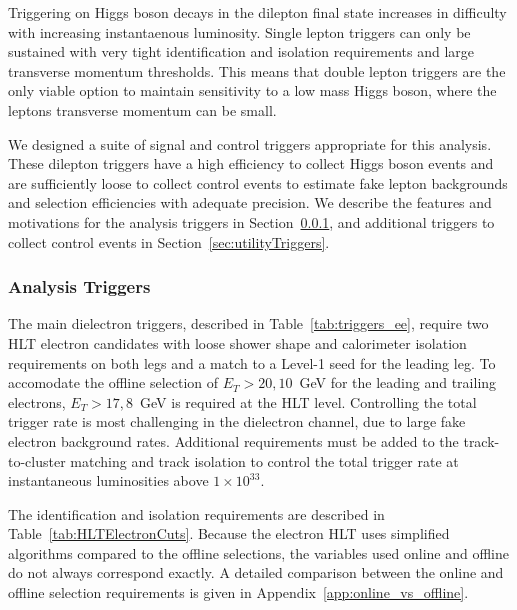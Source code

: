 Triggering on Higgs boson decays in the dilepton final state increases 
in difficulty with increasing instantaenous luminosity.
Single lepton triggers can only be sustained with very tight identification and
isolation requirements and large transverse momentum thresholds.
This means that double lepton triggers are the only viable option to maintain
sensitivity to a low mass Higgs boson, where the leptons transverse momentum
can be small.

We designed a suite of signal and control triggers appropriate for this analysis.
These dilepton triggers have a high efficiency to collect Higgs boson events
and are sufficiently loose to collect control events to estimate
fake lepton backgrounds and selection efficiencies with adequate precision.
We describe the features and motivations for the analysis triggers in Section~\ref{sec:mainTriggers},
and additional triggers to collect control events in Section~\ref{sec:utilityTriggers}.

\subsubsection{Analysis Triggers}
\label{sec:mainTriggers}

The main dielectron triggers, described in Table~\ref{tab:triggers_ee}, require two HLT electron
candidates with loose shower shape and calorimeter isolation requirements on both legs
and a match to a Level-1 seed for the leading leg.
To accomodate the offline selection of $E_{T}>20,10$~GeV for the leading and trailing
electrons, $E_{T}>17,8$~GeV is required at the HLT level.
Controlling the total trigger rate is most challenging in
the dielectron channel, due to large fake electron background rates.
Additional requirements must be added to the track-to-cluster matching
and track isolation to control the total trigger rate at instantaneous luminosities above $1\times10^{33}$.

The identification and isolation requirements are described in Table~\ref{tab:HLTElectronCuts}.
Because the electron HLT uses simplified algorithms compared to the offline selections,
the variables used online and offline do not always correspond exactly.
A detailed comparison between the online and offline selection requirements is given in
Appendix~\ref{app:online_vs_offline}.

